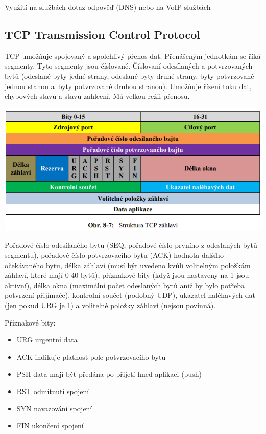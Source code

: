 Využití na službách dotaz-odpověď (DNS) nebo na VoIP službách

\subsection{TCP Transmission Control Protocol}

TCP umožňuje spojovaný a spolehlivý přenos dat. Přenášeným jednotkám se říká segmenty. Tyto segmenty jsou číslované. Číslovaní odesílaných a potvrzovaných bytů (odeslané byty jedné strany, odeslané byty druhé strany, byty potvrzované jednou stanou a~byty potvrzované druhou stranou). Umožňuje řízení toku dat, chybových stavů a stavů zahlcení. Má velkou režii přenosu.


\begin{center}
\includegraphics[scale = 0.5]{images/-051.png}
\end{center}

Pořadové číslo odesílaného bytu (SEQ, pořadové číslo prvního z odeslaných bytů segmentu), pořadové číslo potvrzovacího bytu (ACK) hodnota dalšího očekávaného bytu, délka záhlaví (musí být uvedeno kvůli volitelným položkám záhlaví, které mají 0-40 bytů), příznakové bity (když jsou nastaveny na 1 jsou aktivní), délka okna (maximální počet odeslaných bytů aniž by bylo potřeba potvrzení přijímače), kontrolní součet (podobný UDP), ukazatel naléhavých dat (jen pokud URG je 1) a volitelné položky záhlaví (nejsou povinná).

Příznakové bity:
\begin{itemize}[noitemsep]
    \item URG urgentní data
    \item ACK indikuje platnost pole potvrzovacího bytu
    \item PSH data mají být předána po přijetí hned aplikaci (push)
    \item RST odmítnutí spojení
    \item SYN navazování spojení
    \item FIN ukončení spojení
\end{itemize}

